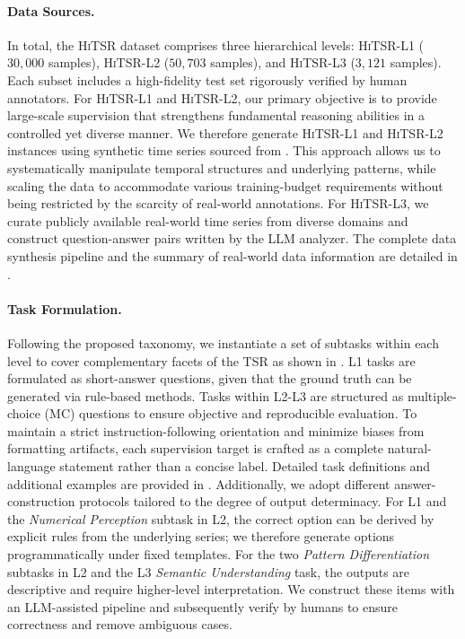 \documentclass[11pt]{article}
\begin{document}
\paragraph{Data Sources.}
In total, the \textsc{HiTSR} dataset comprises three hierarchical levels: \textsc{HiTSR-L1} ($30{,}000$ samples), \textsc{HiTSR-L2} ($50{,}703$ samples), and \textsc{HiTSR-L3} ($3{,}121$ samples). 
Each subset includes a high-fidelity test set rigorously verified by human annotators. 
For \textsc{HiTSR-L1} and \textsc{HiTSR-L2}, our primary objective is to provide large-scale supervision that strengthens fundamental reasoning abilities in a controlled yet diverse manner. 
We therefore generate \textsc{HiTSR-L1} and \textsc{HiTSR-L2} instances using synthetic time series sourced from \cite{chatts}. This approach allows us to systematically manipulate temporal structures and underlying patterns, while scaling the data to accommodate various training-budget requirements without being restricted by the scarcity of real-world annotations. For \textsc{HiTSR-L3}, we curate publicly available real-world time series from diverse domains and construct question-answer pairs written by the LLM analyzer. 
The complete data synthesis pipeline and the summary of real-world data information are detailed in .

\paragraph{Task Formulation.}
Following the proposed taxonomy, we instantiate a set of subtasks within each level to cover complementary facets of the TSR as shown in . L1 tasks are formulated as short-answer questions, given that the ground truth can be generated via rule-based methods. Tasks within L2-L3 are structured as multiple-choice (MC) questions to ensure objective and reproducible evaluation. To maintain a strict instruction-following orientation and minimize biases from formatting artifacts, each supervision target is crafted as a complete natural-language statement rather than a concise label. Detailed task definitions and additional examples are provided in . 
Additionally, we adopt different answer-construction protocols tailored to the degree of output determinacy. For L1 and the \emph{Numerical Perception} subtask in L2, the correct option can be derived by explicit rules from the underlying series; we therefore generate options programmatically under fixed templates. For the two \emph{Pattern Differentiation} subtasks in L2 and the L3 \emph{Semantic Understanding} task, the outputs are descriptive and require higher-level interpretation. We construct these items with an LLM-assisted pipeline and subsequently verify by humans to ensure correctness and remove ambiguous cases.
\end{document}
